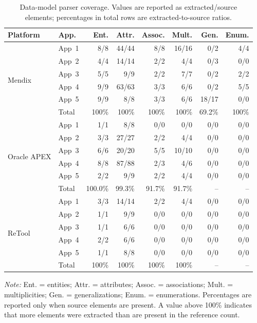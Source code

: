 \begin{table}[t]
\centering
\caption{Data-model parser coverage. Values are reported as extracted/source
elements; percentages in total rows are extracted-to-source ratios.}
\label{tab:parser-data-model}
\scriptsize
\setlength{\tabcolsep}{3.5pt}
\renewcommand{\arraystretch}{1.05}
\begin{tabular}{llrrrrrr}
\toprule
Platform & App. & Ent. & Attr. & Assoc. & Mult. & Gen. & Enum. \\
\midrule
\multirow{6}{*}{Mendix}
& App~1 & 8/8 & 44/44 & 8/8 & 16/16 & 0/2 & 4/4 \\
& App~2 & 4/4 & 14/14 & 2/2 & 4/4 & 0/3 & 0/0 \\
& App~3 & 5/5 & 9/9 & 2/2 & 7/7 & 0/2 & 2/2 \\
& App~4 & 9/9 & 63/63 & 3/3 & 6/6 & 0/2 & 5/5 \\
& App~5 & 9/9 & 8/8 & 3/3 & 6/6 & 18/17 & 0/0 \\
& Total & 100\% & 100\% & 100\% & 100\% & 69.2\% & 100\% \\
\midrule
\multirow{6}{*}{Oracle APEX}
& App~1 & 1/1 & 8/8 & 0/0 & 0/0 & 0/0 & 0/0 \\
& App~2 & 3/3 & 27/27 & 2/2 & 4/4 & 0/0 & 0/0 \\
& App~3 & 6/6 & 20/20 & 5/5 & 10/10 & 0/0 & 0/0 \\
& App~4 & 8/8 & 87/88 & 2/3 & 4/6 & 0/0 & 0/0 \\
& App~5 & 2/2 & 9/9 & 2/2 & 4/4 & 0/0 & 0/0 \\
& Total & 100.0\% & 99.3\% & 91.7\% & 91.7\% & -- & -- \\
\midrule
\multirow{6}{*}{ReTool}
& App~1 & 3/3 & 14/14 & 2/2 & 4/4 & 0/0 & 0/0 \\
& App~2 & 1/1 & 9/9 & 0/0 & 0/0 & 0/0 & 0/0 \\
& App~3 & 1/1 & 6/6 & 0/0 & 0/0 & 0/0 & 0/0 \\
& App~4 & 2/2 & 6/6 & 0/0 & 0/0 & 0/0 & 0/0 \\
& App~5 & 1/1 & 8/8 & 0/0 & 0/0 & 0/0 & 0/0 \\
& Total & 100\% & 100\% & 100\% & 100\% & -- & -- \\
\bottomrule
\end{tabular}
\vspace{0.3em}
\begin{minipage}{0.95\textwidth}
\footnotesize
\textit{Note:} Ent. = entities; Attr. = attributes; Assoc. = associations;
Mult. = multiplicities; Gen. = generalizations; Enum. = enumerations.
Percentages are reported only when source elements are present. A value above
100\% indicates that more elements were extracted than are present in the
reference count.
\end{minipage}
\end{table}

